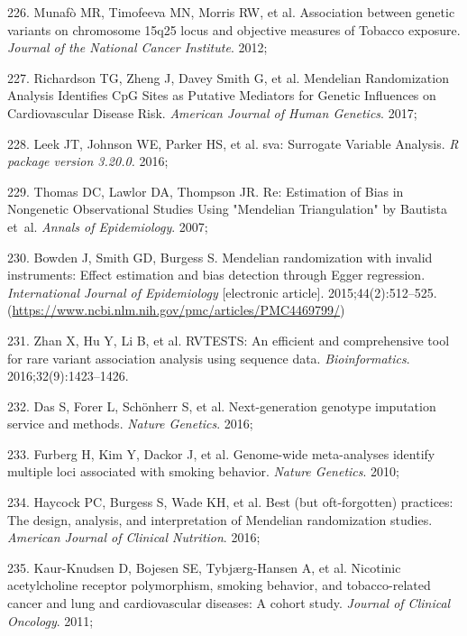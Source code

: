 \documentclass[11pt,oneside]{bristolthesis}
\newenvironment{cslreferences}%
  {}%
  {\par}
\begin{document}
\begin{cslreferences}
\leavevmode\hypertarget{ref-Munafo2012}{}%
226. Munafò MR, Timofeeva MN, Morris RW, et al. Association between genetic variants on chromosome 15q25 locus and objective measures of Tobacco exposure. \emph{Journal of the National Cancer Institute}. 2012;

\leavevmode\hypertarget{ref-Richardson2017}{}%
227. Richardson TG, Zheng J, Davey Smith G, et al. Mendelian Randomization Analysis Identifies CpG Sites as Putative Mediators for Genetic Influences on Cardiovascular Disease Risk. \emph{American Journal of Human Genetics}. 2017;

\leavevmode\hypertarget{ref-Leek2016}{}%
228. Leek JT, Johnson WE, Parker HS, et al. sva: Surrogate Variable Analysis. \emph{R package version 3.20.0.} 2016;

\leavevmode\hypertarget{ref-Thomas2007}{}%
229. Thomas DC, Lawlor DA, Thompson JR. Re: Estimation of Bias in Nongenetic Observational Studies Using "Mendelian Triangulation" by Bautista et~al. \emph{Annals of Epidemiology}. 2007;

\leavevmode\hypertarget{ref-Bowden2015}{}%
230. Bowden J, Smith GD, Burgess S. Mendelian randomization with invalid instruments: Effect estimation and bias detection through Egger regression. \emph{International Journal of Epidemiology} {[}electronic article{]}. 2015;44(2):512--525. (\url{https://www.ncbi.nlm.nih.gov/pmc/articles/PMC4469799/})

\leavevmode\hypertarget{ref-Zhan2016}{}%
231. Zhan X, Hu Y, Li B, et al. RVTESTS: An efficient and comprehensive tool for rare variant association analysis using sequence data. \emph{Bioinformatics}. 2016;32(9):1423--1426.

\leavevmode\hypertarget{ref-Das2016}{}%
232. Das S, Forer L, Schönherr S, et al. Next-generation genotype imputation service and methods. \emph{Nature Genetics}. 2016;

\leavevmode\hypertarget{ref-Furberg2010}{}%
233. Furberg H, Kim Y, Dackor J, et al. Genome-wide meta-analyses identify multiple loci associated with smoking behavior. \emph{Nature Genetics}. 2010;

\leavevmode\hypertarget{ref-Haycock2016}{}%
234. Haycock PC, Burgess S, Wade KH, et al. Best (but oft-forgotten) practices: The design, analysis, and interpretation of Mendelian randomization studies. \emph{American Journal of Clinical Nutrition}. 2016;

\leavevmode\hypertarget{ref-Kaur-Knudsen2011}{}%
235. Kaur-Knudsen D, Bojesen SE, Tybjærg-Hansen A, et al. Nicotinic acetylcholine receptor polymorphism, smoking behavior, and tobacco-related cancer and lung and cardiovascular diseases: A cohort study. \emph{Journal of Clinical Oncology}. 2011;


\end{cslreferences}
\end{document}
